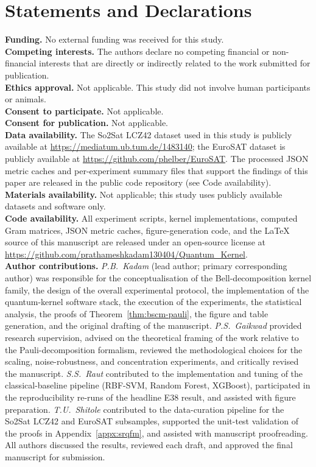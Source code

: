 \documentclass[pdflatex,sn-mathphys]{sn-jnl}
\theoremstyle{plain}
\theoremstyle{remark}
\theoremstyle{definition}
\begin{document}
\section*{Statements and Declarations}
\textbf{Funding.} No external funding was received for this study.\\
\textbf{Competing interests.} The authors declare no competing financial or non-financial interests that are directly or indirectly related to the work submitted for publication.\\
\textbf{Ethics approval.} Not applicable. This study did not involve human participants or animals.\\
\textbf{Consent to participate.} Not applicable.\\
\textbf{Consent for publication.} Not applicable.\\
\textbf{Data availability.} The So2Sat LCZ42 dataset used in this study is publicly available at \url{https://mediatum.ub.tum.de/1483140}; the EuroSAT dataset is publicly available at \url{https://github.com/phelber/EuroSAT}. The processed JSON metric caches and per-experiment summary files that support the findings of this paper are released in the public code repository (see Code availability).\\
\textbf{Materials availability.} Not applicable; this study uses publicly available datasets and software only.\\
\textbf{Code availability.} All experiment scripts, kernel implementations, computed Gram matrices, JSON metric caches, figure-generation code, and the LaTeX source of this manuscript are released under an open-source license at \url{https://github.com/prathameshkadam130404/Quantum_Kernel}.\\
\textbf{Author contributions.}
\emph{P.B.\ Kadam} (lead author; primary corresponding author) was responsible for the conceptualisation of the Bell-decomposition kernel family, the design of the overall experimental protocol, the implementation of the quantum-kernel software stack, the execution of the experiments, the statistical analysis, the proofs of Theorem~\ref{thm:bscm-pauli}, the figure and table generation, and the original drafting of the manuscript.
\emph{P.S.\ Gaikwad} provided research supervision, advised on the theoretical framing of the work relative to the Pauli-decomposition formalism, reviewed the methodological choices for the scaling, noise-robustness, and concentration experiments, and critically revised the manuscript.
\emph{S.S.\ Raut} contributed to the implementation and tuning of the classical-baseline pipeline (RBF-SVM, Random Forest, XGBoost), participated in the reproducibility re-runs of the headline E38 result, and assisted with figure preparation.
\emph{T.U.\ Shitole} contributed to the data-curation pipeline for the So2Sat LCZ42 and EuroSAT subsamples, supported the unit-test validation of the proofs in Appendix~\ref{appx:srqfm}, and assisted with manuscript proofreading.
All authors discussed the results, reviewed each draft, and approved the final manuscript for submission.
\end{document}
